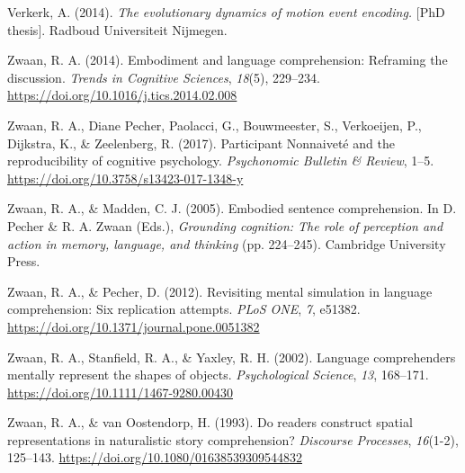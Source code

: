 \documentclass[
  man]{apa7}
\newlength{\cslhangindent}
\newlength{\cslentryspacingunit} %
\newenvironment{CSLReferences}[2] %
 {%
  \setlength{\parindent}{0pt}
  \ifodd #1
  \let\oldpar\par
  \def\par{\hangindent=\cslhangindent\oldpar}
  \fi
  \setlength{\parskip}{#2\cslentryspacingunit}
 }%
 {}
\begin{document}
\begin{CSLReferences}{1}{0}
\leavevmode{}%
Verkerk, A. (2014). \emph{The evolutionary dynamics of motion event encoding.} {[}PhD thesis{]}. Radboud Universiteit Nijmegen.

\leavevmode{}%
Zwaan, R. A. (2014). Embodiment and language comprehension: Reframing the discussion. \emph{Trends in Cognitive Sciences}, \emph{18}(5), 229--234. \url{https://doi.org/10.1016/j.tics.2014.02.008}

\leavevmode{}%
Zwaan, R. A., Diane Pecher, Paolacci, G., Bouwmeester, S., Verkoeijen, P., Dijkstra, K., \& Zeelenberg, R. (2017). Participant {Nonnaiveté} and the reproducibility of cognitive psychology. \emph{Psychonomic Bulletin \& Review}, 1--5. \url{https://doi.org/10.3758/s13423-017-1348-y}

\leavevmode{}%
Zwaan, R. A., \& Madden, C. J. (2005). Embodied sentence comprehension. In D. Pecher \& R. A. Zwaan (Eds.), \emph{Grounding cognition: {The} role of perception and action in memory, language, and thinking} (pp. 224--245). {Cambridge University Press}.

\leavevmode{}%
Zwaan, R. A., \& Pecher, D. (2012). Revisiting mental simulation in language comprehension: Six replication attempts. \emph{PLoS ONE}, \emph{7}, e51382. \url{https://doi.org/10.1371/journal.pone.0051382}

\leavevmode{}%
Zwaan, R. A., Stanfield, R. A., \& Yaxley, R. H. (2002). Language comprehenders mentally represent the shapes of objects. \emph{Psychological Science}, \emph{13}, 168--171. \url{https://doi.org/10.1111/1467-9280.00430}

\leavevmode{}%
Zwaan, R. A., \& van Oostendorp, H. (1993). Do readers construct spatial representations in naturalistic story comprehension? \emph{Discourse Processes}, \emph{16}(1-2), 125--143. \url{https://doi.org/10.1080/01638539309544832}

\end{CSLReferences}

\endgroup
\end{document}
